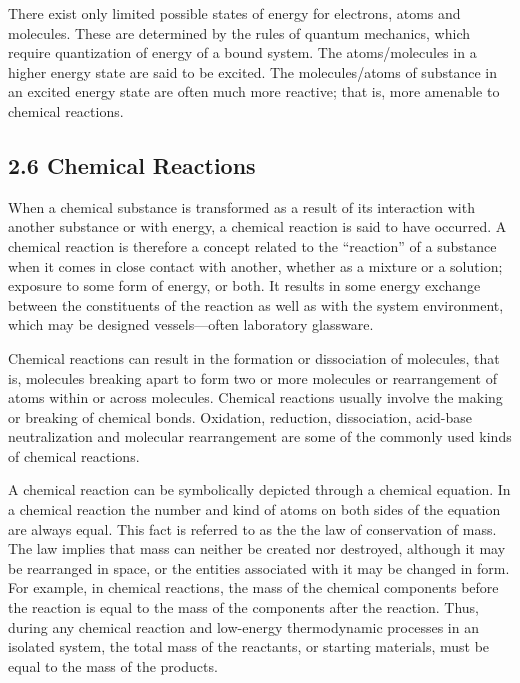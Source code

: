 \documentclass[
]{article}
\theoremstyle{definition}
\theoremstyle{definition}
\theoremstyle{definition}
\theoremstyle{remark}
\begin{document}
There exist only limited possible states of energy for electrons, atoms
and molecules. These are determined by the rules of quantum mechanics,
which require quantization of energy of a bound system. The
atoms/molecules in a higher energy state are said to be excited. The
molecules/atoms of substance in an excited energy state are often much
more reactive; that is, more amenable to chemical reactions.

\hypertarget{chemical-reactions}{%
\subsection{\texorpdfstring{{2.6} Chemical
Reactions}{2.6 Chemical Reactions}}\label{chemical-reactions}}

When a chemical substance is transformed as a result of its interaction
with another substance or with energy, a chemical reaction is said to
have occurred. A chemical reaction is therefore a concept related to the
``reaction'' of a substance when it comes in close contact with another,
whether as a mixture or a solution; exposure to some form of energy, or
both. It results in some energy exchange between the constituents of the
reaction as well as with the system environment, which may be designed
vessels---often laboratory glassware.

Chemical reactions can result in the formation or dissociation of
molecules, that is, molecules breaking apart to form two or more
molecules or rearrangement of atoms within or across molecules. Chemical
reactions usually involve the making or breaking of chemical bonds.
Oxidation, reduction, dissociation, acid-base neutralization and
molecular rearrangement are some of the commonly used kinds of chemical
reactions.

A chemical reaction can be symbolically depicted through a chemical
equation. In a chemical reaction the number and kind of atoms on both
sides of the equation are always equal. This fact is referred to as the
the law of conservation of mass. The law implies that mass can neither
be created nor destroyed, although it may be rearranged in space, or the
entities associated with it may be changed in form. For example, in
chemical reactions, the mass of the chemical components before the
reaction is equal to the mass of the components after the reaction.
Thus, during any chemical reaction and low-energy thermodynamic
processes in an isolated system, the total mass of the reactants, or
starting materials, must be equal to the mass of the products.
\end{document}
